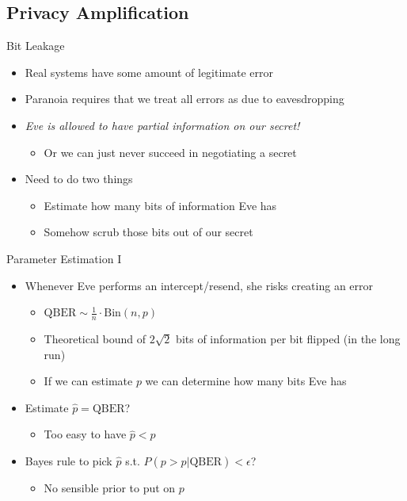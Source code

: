 \documentclass[pdf]{beamer}
\begin{document}
\subsection{Privacy Amplification}
\begin{frame}{Bit Leakage}
  \begin{itemize}
  \item Real systems have some amount of legitimate error
  \item Paranoia requires that we treat all errors as due to eavesdropping
  \item \emph{Eve is allowed to have partial information on our secret!}
    \begin{itemize}
    \item Or we can just never succeed in negotiating a secret
    \end{itemize}
  \item Need to do two things
    \begin{itemize}
    \item Estimate how many bits of information Eve has
    \item Somehow scrub those bits out of our secret
    \end{itemize}
  \end{itemize}
\end{frame}
\begin{frame}{Parameter Estimation I}
  \begin{itemize}
  \item Whenever Eve performs an intercept/resend, she risks creating an error
    \begin{itemize}
    \item $\text{QBER} \sim \frac{1}{n} \cdot \text{Bin}(n, p)$
    \item Theoretical bound of $2 \sqrt{2}$ bits of information per bit flipped (in the long run)
    \item If we can estimate $p$ we can determine how many bits Eve has
    \end{itemize}
  \item Estimate $\hat{p} = \text{QBER}$?
    \begin{itemize}
    \item Too easy to have $\hat{p} < p$
    \end{itemize}
  \item Bayes rule to pick $\hat{p}$ s.t. $P(p > \hat{p} | \text{QBER}) < \epsilon$?
    \begin{itemize}
    \item No sensible prior to put on $p$
    \end{itemize}
  \end{itemize}
\end{frame}
\end{document}
